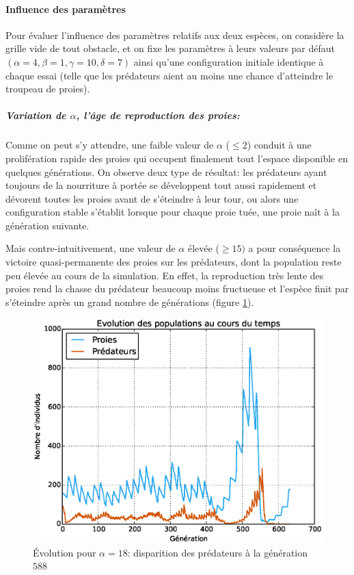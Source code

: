\documentclass[11pt]{article}
\begin{document}
\paragraph{Influence des paramètres}
Pour évaluer l'influence des paramètres relatifs aux deux espèces, on considère la grille vide de tout obstacle, et on fixe les paramètres à leurs valeurs par défaut $(\alpha = 4, \beta = 1, \gamma = 10, \delta = 7)$ ainsi qu'une configuration initiale identique à chaque essai (telle que les prédateurs aient au moins une chance d'atteindre le troupeau de proies).

\subparagraph{Variation de $\alpha$, l'âge de reproduction des proies:}

Comme on peut s'y attendre, une faible valeur de $\alpha$ ($\leq 2$) conduit à une prolifération rapide des proies qui occupent finalement tout l'espace disponible en quelques générations. On observe deux type de résultat: les prédateurs ayant toujours de la nourriture à portée se développent tout aussi rapidement et dévorent toutes les proies avant de s'éteindre à leur tour, ou alors une configuration stable s'établit lorsque pour chaque proie tuée, une proie naît à la génération suivante.

Mais contre-intuitivement, une valeur de $\alpha$ élevée ($\geq 15)$ a pour conséquence la victoire quasi-permanente des proies sur les prédateurs, dont la population reste peu élevée au cours de la simulation. En effet, la reproduction très lente des proies rend la chasse du prédateur beaucoup moins fructueuse et l'espèce finit par s'éteindre après un grand nombre de générations (figure \ref{fig:taux_proie_eleve}).

\begin{figure}[!ht]
    \centering
    \includegraphics[width=12cm]{taux_proie_grand.eps}
    \caption{Évolution pour $\alpha = 18$: disparition des prédateurs à la génération $588$}
    \label{fig:taux_proie_eleve}
\end{figure}
\end{document}
